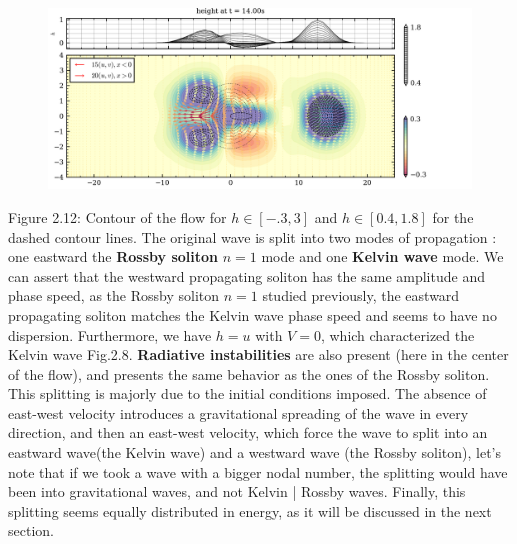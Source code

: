 \documentclass[11pt,a4paper]{report}
\begin{document}
\begin{figure}[H]
    \includegraphics[width=\textwidth]{./figure/kelvin_wave_0_speed.png}
\end{figure}
Figure 2.12: Contour of the flow for $h\in[-.3,3]$ and $h\in[0.4,1.8]$ for the dashed contour lines. The original wave is split into two modes of propagation : one eastward the \textbf{Rossby soliton} $n = 1$ mode and one \textbf{Kelvin wave} mode. We can assert that  the westward propagating soliton has the same amplitude and phase speed, as the Rossby soliton $n = 1$ studied previously, the eastward propagating soliton matches the Kelvin wave phase speed and seems to have no dispersion. Furthermore, we have
$h = u$  with $V = 0$, which characterized the Kelvin wave Fig.2.8. \textbf{Radiative instabilities} are also present (here in the center of the flow), and presents the same behavior as the ones of the Rossby soliton. This splitting is majorly due to the initial conditions imposed.
The absence of east-west velocity introduces a gravitational spreading of the wave in every direction, and then an east-west velocity, which force the wave to split into an eastward wave(the Kelvin wave) and a westward wave (the Rossby soliton), let's note that if we took a wave with a bigger nodal number, the splitting would have been into gravitational waves, and not Kelvin | Rossby waves.
Finally, this splitting seems equally distributed in energy, as it will be discussed in the next section.
\end{document}
